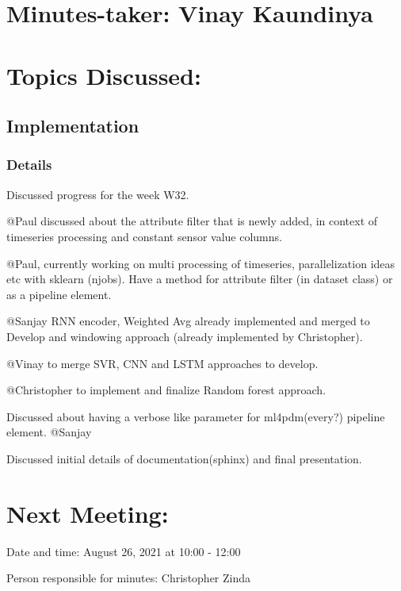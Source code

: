 \documentclass[11pt]{meetingmins} %
\begin{document}
\maketitle

\section{Minutes-taker: Vinay Kaundinya}

\section{Topics Discussed:}

\subsection{Implementation}
\subsubsection{Details}
\begin{hiddensubitems}
    \item Discussed progress for the week W32.
    \item @Paul discussed about the attribute filter that is newly added, in context of timeseries processing and constant sensor value columns.
    \item @Paul, currently working on multi processing of timeseries, parallelization ideas etc with sklearn (njobs). Have a method for attribute filter (in dataset class) or as a pipeline element.
    \item @Sanjay RNN encoder, Weighted Avg already implemented and merged to Develop and windowing approach (already implemented by Christopher).
    \item @Vinay to merge SVR, CNN and LSTM approaches to develop.
    \item @Christopher to implement and finalize Random forest approach.
    \item Discussed about having a verbose like parameter for ml4pdm(every?) pipeline element. @Sanjay
    \item Discussed initial details of documentation(sphinx) and final presentation.
\end{hiddensubitems}

\section{Next Meeting:}
\begin{hiddensubitems}
    \item Date and time: August 26, 2021 at 10:00 - 12:00
    \item Person responsible for minutes: Christopher Zinda
\end{hiddensubitems}
\end{document}
